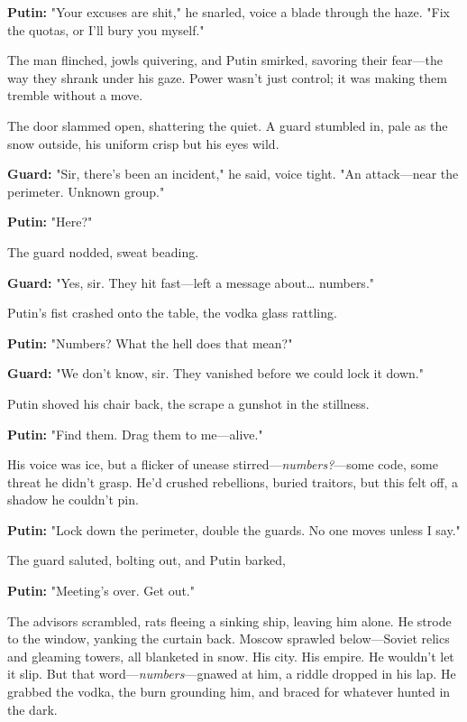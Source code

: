 \documentclass[12pt]{book}
\begin{document}
\vspace{0.5em}
\textbf{Putin:} "Your excuses are shit," he snarled, voice a blade through the haze. "Fix the quotas, or I'll bury you myself."

The man flinched, jowls quivering, and Putin smirked, savoring their fear—the way they shrank under his gaze. Power wasn’t just control; it was making them tremble without a move.

The door slammed open, shattering the quiet. A guard stumbled in, pale as the snow outside, his uniform crisp but his eyes wild.

\vspace{0.5em}
\textbf{Guard:} "Sir, there’s been an incident," he said, voice tight. "An attack—near the perimeter. Unknown group."

\textbf{Putin:} "Here?"

The guard nodded, sweat beading.

\vspace{0.5em}
\textbf{Guard:} "Yes, sir. They hit fast—left a message about… numbers."

Putin’s fist crashed onto the table, the vodka glass rattling.

\vspace{0.5em}
\textbf{Putin:} "Numbers? What the hell does that mean?"

\textbf{Guard:} "We don’t know, sir. They vanished before we could lock it down."

Putin shoved his chair back, the scrape a gunshot in the stillness.

\vspace{0.5em}
\textbf{Putin:} "Find them. Drag them to me—alive."

His voice was ice, but a flicker of unease stirred—\emph{numbers?}—some code, some threat he didn’t grasp. He’d crushed rebellions, buried traitors, but this felt off, a shadow he couldn’t pin.

\vspace{0.5em}
\textbf{Putin:} "Lock down the perimeter, double the guards. No one moves unless I say."

The guard saluted, bolting out, and Putin barked,

\vspace{0.5em}
\textbf{Putin:} "Meeting’s over. Get out."

The advisors scrambled, rats fleeing a sinking ship, leaving him alone. He strode to the window, yanking the curtain back. Moscow sprawled below—Soviet relics and gleaming towers, all blanketed in snow. His city. His empire. He wouldn’t let it slip. But that word—\emph{numbers}—gnawed at him, a riddle dropped in his lap. He grabbed the vodka, the burn grounding him, and braced for whatever hunted in the dark.
\end{document}
